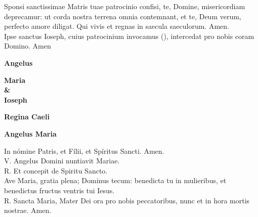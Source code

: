 \documentclass[letterpaper, landscape, 10pt, twocolumn]{article}
\begin{document}
  \noindent
  {\color{red} S}ponsi sanctissimae Matris tuae patrocinio confisi, te, Domine, misericordiam deprecamur: ut corda nostra terrena omnia contemnant, et te, Deum verum, perfecto amore diligat. Qui vivis et regnas in saecula saeculorum. {\color{red} A}men.\\

  \noindent
  {\color{red} I}pse sanctus Ioseph, cuius patrocinium invocamus {\color{red} (\large \maltese)}, intercedat pro nobis coram Domino. {\color{red} A}men
  \vfill

  \vspace*{3cm}
  \begin{center}
    {\fontsize{50pt}{60pt}\selectfont \textbf{Angelus}}\\
  \end{center}

  \begin{center}
    {\fontsize{30pt}{36pt}\selectfont \textbf{Maria\\ \&\\ Ioseph}}\\
  \end{center}

  \vspace{2cm}
  \begin{center}
    {\fontsize{50pt}{60pt}\selectfont \textbf{Regina Caeli}}\\
  \end{center}
  \clearpage

  \begin{center}
    {\fontsize{50pt}{60pt}\selectfont \textbf{Angelus Maria}}\\
  \end{center}
  \vspace{1cm}

  \noindent
  \Large {\color{red} I}n nómine Patris, et Fílii, et Spíritus Sancti. {\color{red} A}men.\\

  \noindent
  \normalsize
  {\color{red} V. A}ngelus Domini nuntiavit Mariae.\\
  {\color{red} R. E}t concepit de Spiritu Sancto.\\

  \noindent
  {\color{red} A}ve Maria, gratia plena; Dominus tecum: benedicta tu in mulieribus, et benedictus fructus ventris tui Iesus.\\
  {\color{red} R. S}ancta Maria, Mater Dei ora pro nobis peccatoribus, nunc et in hora mortis nostrae. {\color{red} A}men.\\
\end{document}
